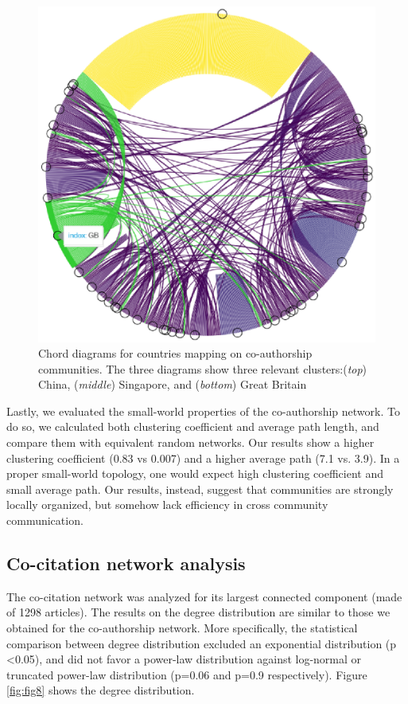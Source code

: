 \documentclass[a4paper, review, endfloat, doubleblind, authoryear]{elsarticle}
\begin{document}
\begin{figure}[htbp]
		\includegraphics[height=0.3\textheight, keepaspectratio]{pics/coauthorship_country_chord_3.eps}
		\caption{Chord diagrams for countries mapping on co-authorship communities. The three diagrams show three relevant clusters:(\textit{top}) China, (\textit{middle}) Singapore, and (\textit{bottom}) Great Britain}\label{fig:fig7}
	\end{figure}
	
	Lastly, we evaluated the small-world properties of the co-authorship network. To do so, we calculated both clustering coefficient and average path length, and compare them with equivalent random networks. Our results show a higher clustering coefficient (0.83 vs 0.007) and a higher average path (7.1 vs. 3.9). In a proper small-world topology, one would expect high clustering coefficient and small average path. Our results, instead, suggest that communities are strongly locally organized, but somehow lack efficiency in cross community communication.
	
	\subsection{Co-citation network analysis}
	The co-citation network was analyzed for its largest connected component (made of 1298 articles). The results on the degree distribution are similar to those we obtained for the co-authorship network. More specifically, the statistical comparison between degree distribution excluded an exponential distribution (p \textless 0.05), and did not favor a power-law distribution against log-normal or truncated power-law distribution (p=0.06 and p=0.9 respectively). Figure \ref{fig:fig8} shows the degree distribution.
	
\end{document}
